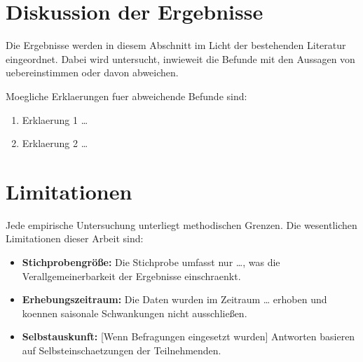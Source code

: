 \section{Diskussion der Ergebnisse}
\label{sec:diskussion}

Die Ergebnisse werden in diesem Abschnitt im Licht der bestehenden Literatur
eingeordnet. Dabei wird untersucht, inwieweit die Befunde mit den Aussagen
von \textcite{beispiel_artikel_2019} uebereinstimmen oder davon abweichen.

Moegliche Erklaerungen fuer abweichende Befunde sind:
\begin{enumerate}
  \item Erklaerung 1 \ldots
  \item Erklaerung 2 \ldots
\end{enumerate}

\section{Limitationen}
\label{sec:limitationen}

Jede empirische Untersuchung unterliegt methodischen Grenzen. Die wesentlichen
Limitationen dieser Arbeit sind:

\begin{itemize}
  \item \textbf{Stichprobengröße:} Die Stichprobe umfasst nur \ldots,
        was die Verallgemeinerbarkeit der Ergebnisse einschraenkt.
  \item \textbf{Erhebungszeitraum:} Die Daten wurden im Zeitraum \ldots
        erhoben und koennen saisonale Schwankungen nicht ausschließen.
  \item \textbf{Selbstauskunft:} [Wenn Befragungen eingesetzt wurden]
        Antworten basieren auf Selbsteinschaetzungen der Teilnehmenden.
\end{itemize}
